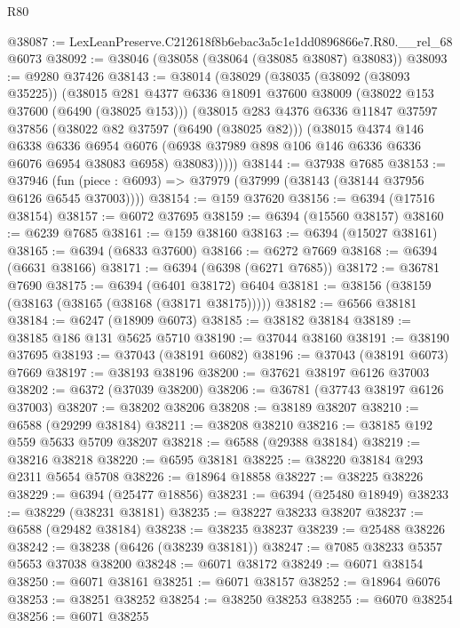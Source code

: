 \begin{lexlean}{R80}
\begin{coremodule}
@38087 := LexLeanPreserve.C212618f8b6ebac3a5c1e1dd0896866e7.R80.__rel_68 @6073
@38092 := @38046 (@38058 (@38064 (@38085 @38087) @38083))
@38093 := @9280 @37426
@38143 := @38014
    (@38029
      (@38035
        (@38092 (@38093 @35225))
        (@38015
          @281
          @4377
          @6336
          @18091
          @37600
          @38009
          (@38022 @153 @37600 (@6490 (@38025 @153)))
          (@38015
            @283
            @4376
            @6336
            @11847
            @37597
            @37856
            (@38022 @82 @37597 (@6490 (@38025 @82)))
            (@38015
              @4374
              @146
              @6338
              @6336
              @6954
              @6076
              (@6938 @37989 @898 @106 @146 @6336 @6336 @6076 @6954 @38083 @6958)
              @38083)))))
@38144 := @37938 @7685
@38153 := @37946
    (fun (piece : @6093) => @37979 (@37999 (@38143 (@38144 @37956 @6126 @6545 @37003))))
@38154 := @159 @37620
@38156 := @6394 (@17516 @38154)
@38157 := @6072 @37695
@38159 := @6394 (@15560 @38157)
@38160 := @6239 @7685
@38161 := @159 @38160
@38163 := @6394 (@15027 @38161)
@38165 := @6394 (@6833 @37600)
@38166 := @6272 @7669
@38168 := @6394 (@6631 @38166)
@38171 := @6394 (@6398 (@6271 @7685))
@38172 := @36781 @7690
@38175 := @6394 (@6401 @38172) @6404
@38181 := @38156 (@38159 (@38163 (@38165 (@38168 (@38171 @38175)))))
@38182 := @6566 @38181
@38184 := @6247 (@18909 @6073)
@38185 := @38182 @38184
@38189 := @38185 @186 @131 @5625 @5710
@38190 := @37044 @38160
@38191 := @38190 @37695
@38193 := @37043 (@38191 @6082)
@38196 := @37043 (@38191 @6073) @7669
@38197 := @38193 @38196
@38200 := @37621 @38197 @6126 @37003
@38202 := @6372 (@37039 @38200)
@38206 := @36781 (@37743 @38197 @6126 @37003)
@38207 := @38202 @38206
@38208 := @38189 @38207
@38210 := @6588 (@29299 @38184)
@38211 := @38208 @38210
@38216 := @38185 @192 @559 @5633 @5709 @38207
@38218 := @6588 (@29388 @38184)
@38219 := @38216 @38218
@38220 := @6595 @38181
@38225 := @38220 @38184 @293 @2311 @5654 @5708
@38226 := @18964 @18858
@38227 := @38225 @38226
@38229 := @6394 (@25477 @18856)
@38231 := @6394 (@25480 @18949)
@38233 := @38229 (@38231 @38181)
@38235 := @38227 @38233 @38207
@38237 := @6588 (@29482 @38184)
@38238 := @38235 @38237
@38239 := @25488 @38226
@38242 := @38238 (@6426 (@38239 @38181))
@38247 := @7085 @38233 @5357 @5653 @37038 @38200
@38248 := @6071 @38172
@38249 := @6071 @38154
@38250 := @6071 @38161
@38251 := @6071 @38157
@38252 := @18964 @6076
@38253 := @38251 @38252
@38254 := @38250 @38253
@38255 := @6070 @38254
@38256 := @6071 @38255

\end{coremodule}
\end{lexlean}
